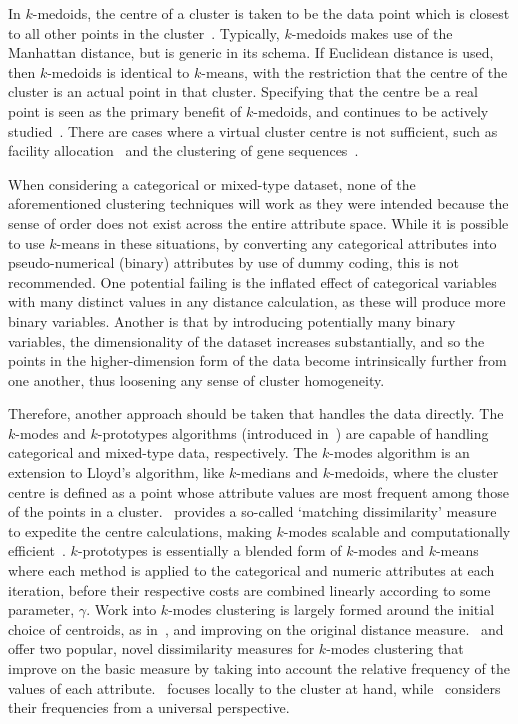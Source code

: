 In \(k\)-medoids, the centre of a cluster is taken to be the data point
which is closest to all other points in the cluster~\cite{Kaufman1987}.
Typically, \(k\)-medoids makes use of the Manhattan distance, but is generic in
its schema. If Euclidean distance is used, then \(k\)-medoids is identical to
\(k\)-means, with the restriction that the centre of the cluster is an actual
point in that cluster. Specifying that the centre be a real point is seen as the
primary benefit of \(k\)-medoids, and continues to be actively
studied~\cite{Schubert2019,Ushakov2021}. There are cases where a virtual cluster
centre is not sufficient, such as facility allocation~\cite{Chen2016,Wang2020}
and the clustering of gene sequences~\cite{Johnson2018}.

When considering a categorical or mixed-type dataset, none of the aforementioned
clustering techniques will work as they were intended because the sense of order
does not exist across the entire attribute space. While it is possible to use
\(k\)-means in these situations, by converting any categorical attributes into
pseudo-numerical (binary) attributes by use of dummy coding, this is not
recommended. One potential failing is the inflated effect of categorical
variables with many distinct values in any distance calculation, as these will
produce more binary variables. Another is that by introducing potentially many
binary variables, the dimensionality of the dataset increases substantially, and
so the points in the higher-dimension form of the data become intrinsically
further from one another, thus loosening any sense of cluster homogeneity.

Therefore, another approach should be taken that handles the data directly. The
\(k\)-modes and \(k\)-prototypes algorithms (introduced in~\cite{Huang1998}) are
capable of handling categorical and mixed-type data, respectively. The
\(k\)-modes algorithm is an extension to Lloyd's algorithm, like \(k\)-medians
and \(k\)-medoids, where the cluster centre is defined as a point whose
attribute values are most frequent among those of the points in a
cluster.~\cite{Huang1998} provides a so-called `matching dissimilarity' measure
to expedite the centre calculations, making \(k\)-modes scalable and
computationally efficient~\cite{Madhuri2014}. \(k\)-prototypes is essentially a
blended form of \(k\)-modes and \(k\)-means where each method is applied to the
categorical and numeric attributes at each iteration, before their respective
costs are combined linearly according to some parameter, \(\gamma\). Work into
\(k\)-modes clustering is largely formed around the initial choice of centroids,
as in~\cite{Cao2009,Jiang2016,Khan2013,Khan2007,Taoying2013}, and improving on
the original distance measure.~\cite{Cao2012} and~\cite{Ng2007} offer two
popular, novel dissimilarity measures for \(k\)-modes clustering that improve on
the basic measure by taking into account the relative frequency of the values of
each attribute.~\cite{Ng2007} focuses locally to the cluster at hand,
while~\cite{Cao2012} considers their frequencies from a universal perspective.

